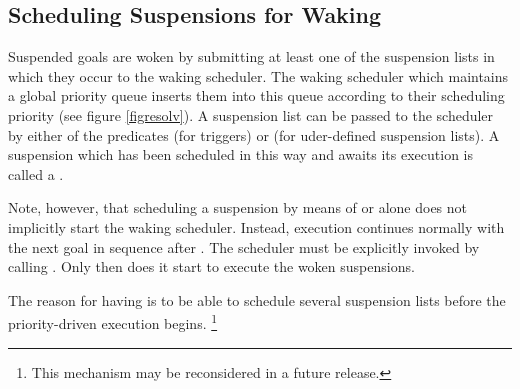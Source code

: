 \subsection{Scheduling Suspensions for Waking}
\label{secwaking}%
Suspended goals are woken by submitting at least one of the suspension lists
in which they occur to the waking scheduler.
The waking scheduler which maintains a global priority queue inserts
them into this queue according to their scheduling priority (see figure \ref{figresolv}).
A suspension list can be passed to the scheduler by either of the predicates
(for triggers)
or
(for uder-defined suspension lists).
A suspension which has been scheduled in this way and awaits
its execution is called a
.

Note, however, that scheduling a suspension by means of
or
alone does not implicitly start the waking scheduler.
Instead, execution continues normally with the next goal in sequence after
.
The scheduler must be explicitly invoked by calling
.
Only then does it start to execute the woken suspensions.

The reason for having 
is to be able to schedule several suspension lists before the
priority-driven execution begins.%
\footnote{This mechanism may be reconsidered in a future release.}



